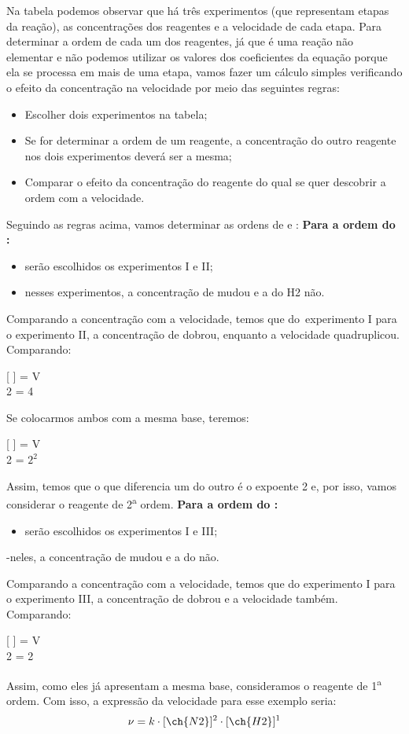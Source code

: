 \documentclass[10pt]{scrartcl}
\begin{document}
Na tabela podemos observar que há três experimentos (que representam etapas da reação), as concentrações dos reagentes e a velocidade de cada etapa.
Para determinar a ordem de cada um dos reagentes, já que é uma reação não elementar e não podemos utilizar os valores dos coeficientes da equação porque ela se processa em mais de uma etapa, vamos fazer um cálculo simples verificando o efeito da concentração na velocidade por meio das seguintes regras:
\begin{itemize}
\item Escolher dois experimentos na tabela;
\item Se for determinar a ordem de um reagente, a concentração do outro reagente nos dois experimentos deverá ser a mesma;
\item Comparar o efeito da concentração do reagente do qual se quer descobrir a ordem com a velocidade.
\end{itemize}
Seguindo as regras acima, vamos determinar as ordens de e :
\textbf{Para a ordem do :}
\begin{itemize}
\item serão escolhidos os experimentos I e II;
\item nesses experimentos, a concentração de  mudou e a do H2 não.
\end{itemize}
Comparando a concentração com a velocidade, temos que do experimento I para o experimento II, a concentração de  dobrou, enquanto a velocidade quadruplicou. Comparando:
\begin{center}
{[} ] = V\\
2 = 4
\end{center}
Se colocarmos ambos com a mesma base, teremos:
\begin{center}
{[} ] = V\\
2 = \(2^2\)
\end{center}
Assim, temos que o que diferencia um do outro é o expoente 2 e, por isso, vamos considerar o reagente  de 2\textsuperscript{a} ordem.
\textbf{Para a ordem do :}
\begin{itemize}
\item serão escolhidos os experimentos I e III;
\end{itemize}
-neles, a concentração de  mudou e a do  não.

Comparando a concentração com a velocidade, temos que do experimento I para o experimento III, a concentração de  dobrou e a velocidade também. Comparando:
\begin{center}
{[} ] = V\\
2 = 2
\end{center}
Assim, como eles já apresentam a mesma base, consideramos o reagente  de 1\textsuperscript{a} ordem. Com isso, a expressão da velocidade para esse exemplo seria:
\begin{equation*}
\nu = k\cdot[\ch{N2}]^2\cdot[\ch{H2}]^1
\end{equation*}
\end{document}
